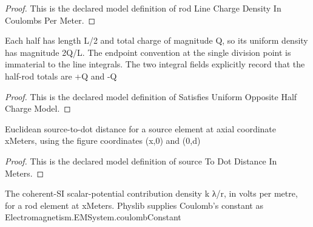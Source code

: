 \begin{proof}
  This is the declared model definition of rod Line Charge Density In Coulombs Per Meter.
\end{proof}
\begin{definition}
  \label{def:physics:phyx-mini-0863:phyxminiproblems-problemphyxmini0863-satisfiesuniformoppositehalfchargemodel}
  Each half has length L/2 and total charge of magnitude Q, so its uniform density has magnitude 2Q/L. The endpoint convention at the single division point is immaterial to the line integrals. The two integral fields explicitly record that the half-rod totals are +Q and -Q
\end{definition}
\begin{proof}
  This is the declared model definition of Satisfies Uniform Opposite Half Charge Model.
\end{proof}
\begin{definition}
  \label{def:physics:phyx-mini-0863:phyxminiproblems-problemphyxmini0863-sourcetodotdistanceinmeters}
  Euclidean source-to-dot distance for a source element at axial coordinate xMeters, using the figure coordinates (x,0) and (0,d)
\end{definition}
\begin{proof}
  This is the declared model definition of source To Dot Distance In Meters.
\end{proof}
\begin{definition}
  \label{def:physics:phyx-mini-0863:phyxminiproblems-problemphyxmini0863-potentialcontributiondensityinvoltspermeter}
  The coherent-SI scalar-potential contribution density k λ/r, in volts per metre, for a rod element at xMeters. Physlib supplies Coulomb's constant as Electromagnetism.EMSystem.coulombConstant
\end{definition}
